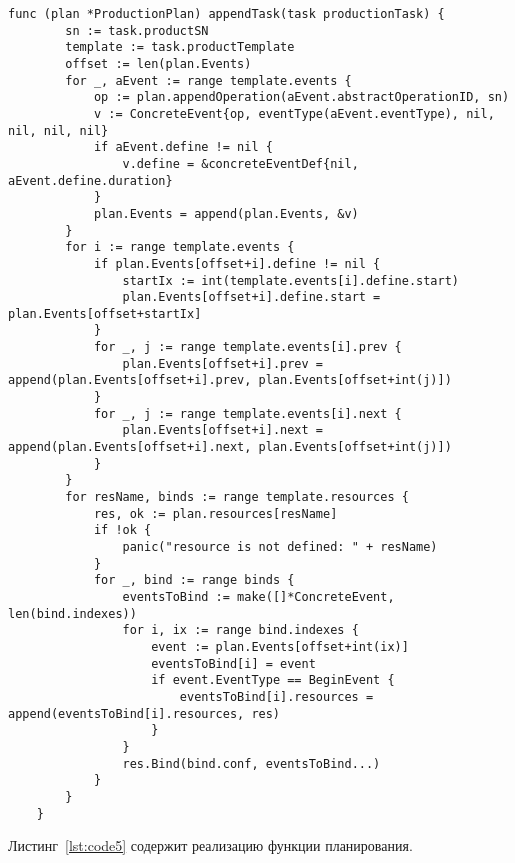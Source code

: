 \begin{lstlisting}[language=Golang,caption={Создание заданий},label=lst:code4]
    func (plan *ProductionPlan) appendTask(task productionTask) {
        sn := task.productSN
        template := task.productTemplate
        offset := len(plan.Events)
        for _, aEvent := range template.events {
            op := plan.appendOperation(aEvent.abstractOperationID, sn)
            v := ConcreteEvent{op, eventType(aEvent.eventType), nil, nil, nil, nil}
            if aEvent.define != nil {
                v.define = &concreteEventDef{nil, aEvent.define.duration}
            }
            plan.Events = append(plan.Events, &v)
        }
        for i := range template.events {
            if plan.Events[offset+i].define != nil {
                startIx := int(template.events[i].define.start)
                plan.Events[offset+i].define.start = plan.Events[offset+startIx]
            }
            for _, j := range template.events[i].prev {
                plan.Events[offset+i].prev = append(plan.Events[offset+i].prev, plan.Events[offset+int(j)])
            }
            for _, j := range template.events[i].next {
                plan.Events[offset+i].next = append(plan.Events[offset+i].next, plan.Events[offset+int(j)])
            }
        }
        for resName, binds := range template.resources {
            res, ok := plan.resources[resName]
            if !ok {
                panic("resource is not defined: " + resName)
            }
            for _, bind := range binds {
                eventsToBind := make([]*ConcreteEvent, len(bind.indexes))
                for i, ix := range bind.indexes {
                    event := plan.Events[offset+int(ix)]
                    eventsToBind[i] = event
                    if event.EventType == BeginEvent {
                        eventsToBind[i].resources = append(eventsToBind[i].resources, res)
                    }
                }
                res.Bind(bind.conf, eventsToBind...)
            }
        }
    }
\end{lstlisting}


Листинг~\ref{lst:code5} содержит реализацию функции планирования.

